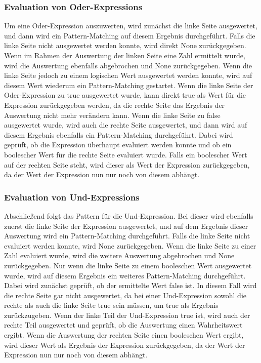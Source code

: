 \documentclass[a4paper, 1ppt]{article}
\begin{document}
\subsubsection{Evaluation von Oder-Expressions}
Um eine Oder-Expression auszuwerten, wird zunächst die linke Seite ausgewertet, und dann wird ein Pattern-Matching auf diesem Ergebnis durchgeführt. Falls die linke Seite nicht ausgewertet werden konnte, wird direkt None zurückgegeben. Wenn im Rahmen der Auswertung der linken Seite eine Zahl ermittelt wurde, wird die Auswertung ebenfalls abgebrochen und None zurückgegeben. Wenn die linke Seite jedoch zu einem logischen Wert ausgewertet werden konnte, wird auf diesem Wert wiederum ein Pattern-Matching gestartet. Wenn die linke Seite der Oder-Expression zu true ausgewertet wurde, kann direkt true als Wert für die Expression zurückgegeben werden, da die rechte Seite das Ergebnis der Auswertung nicht mehr verändern kann. Wenn die linke Seite zu false ausgewertet wurde, wird auch die rechte Seite ausgewertet, und dann wird auf diesem Ergebnis ebenfalls ein Pattern-Matching durchgeführt. Dabei wird geprüft, ob die Expression überhaupt evaluiert werden konnte und ob ein boolescher Wert für die rechte Seite evaluiert wurde. Falls ein boolescher Wert auf der rechten Seite steht, wird dieser als Wert der Expression zurückgegeben, da der Wert der Expression nun nur noch von diesem abhängt.
\newline
\subsubsection{Evaluation von Und-Expressions}
Abschließend folgt das Pattern für die Und-Expression. Bei dieser wird ebenfalls zuerst die linke Seite der Expression ausgewertet, und auf dem Ergebnis dieser Auswertung wird ein Pattern-Matching durchgeführt. Falls die linke Seite nicht evaluiert werden konnte, wird None zurückgegeben. Wenn die linke Seite zu einer Zahl evaluiert wurde, wird die weitere Auswertung abgebrochen und None zurückgegeben. Nur wenn die linke Seite zu einem booleschen Wert ausgewertet wurde, wird auf diesem Ergebnis ein weiteres Pattern-Matching durchgeführt. Dabei wird zunächst geprüft, ob der ermittelte Wert false ist. In diesem Fall wird die rechte Seite gar nicht ausgewertet, da bei einer Und-Expression sowohl die rechte als auch die linke Seite true sein müssen, um true als Ergebnis zurückzugeben. Wenn der linke Teil der Und-Expression true ist, wird auch der rechte Teil ausgewertet und geprüft, ob die Auswertung einen Wahrheitswert ergibt. Wenn die Auswertung der rechten Seite einen booleschen Wert ergibt, wird dieser Wert als Ergebnis der Expression zurückgegeben, da der Wert der Expression nun nur noch von diesem abhängt.
\end{document}
